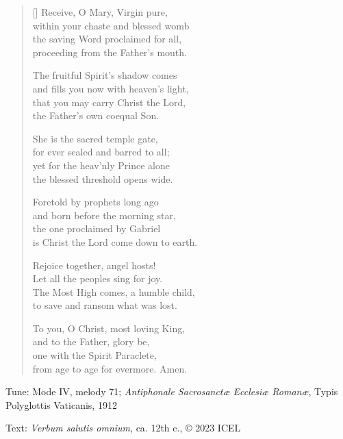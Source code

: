 \hymn

\settowidth{\versewidth}{and fills you now with heaven’s light,}

\begin{verse}[\versewidth]
Receive, O Mary, Virgin pure,\\
within your chaste and blessed womb\\
the saving Word proclaimed for all,\\
proceeding from the Father’s mouth.

The fruitful Spirit’s shadow comes\\
and fills you now with heaven’s light,\\
that you may carry Christ the Lord,\\
the Father’s own coequal Son.

She is the sacred temple gate,\\
for ever sealed and barred to all;\\
yet for the heav’nly Prince alone\\
the blessed threshold opens wide.

Foretold by prophets long ago\\
and born before the morning star,\\
the one proclaimed by Gabriel\\
is Christ the Lord come down to earth.

Rejoice together, angel hosts!\\
Let all the peoples sing for joy.\\
The Most High comes, a humble child,\\
to save and ransom what was lost.

To you, O Christ, most loving King,\\
and to the Father, glory be,\\
one with the Spirit Paraclete,\\
from age to age for evermore. Amen.
\end{verse}

\begin{hymnsource}
Tune: Mode IV, melody 71; \emph{Antiphonale Sacrosanctæ Ecclesiæ Romanæ}, Typis Polyglottis Vaticanis, 1912

Text: \emph{Verbum salutis omnium}, ca. 12th c., © 2023 ICEL

\end{hymnsource}